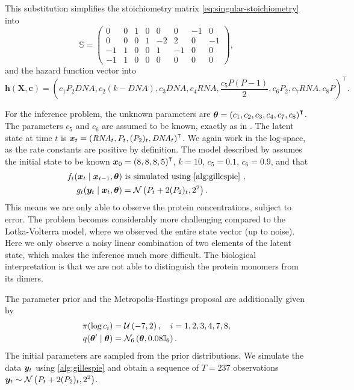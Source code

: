 This substitution simplifies the stoichiometry matrix \eqref{eq:singular-stoichiometry} into
\begin{equation*}
\mathbb{S} = \begin{pmatrix}
0 & 0 & 1 & 0 & 0 & 0 & -1 & 0 \\
0 & 0 & 0 & 1 & -2 & 2 & 0 & -1 \\
-1 & 1 & 0 & 0 & 1 & -1 & 0 & 0 \\
-1 & 1 & 0 & 0 & 0 & 0 & 0 & 0
\end{pmatrix},
\end{equation*}
and the hazard function vector into
\begin{equation*}
\bm{h}(\bm{X}, \bm{c}) = \left(c_1 P_2 \mathit{DNA}, c_2 (k - \mathit{DNA}), c_3 \mathit{DNA}, c_4 \mathit{RNA}, \frac{c_5 P(P-1)}{2}, c_6 P_2, c_7 \mathit{RNA}, c_8 P \right)^\intercal.
\end{equation*}

For the inference problem, the unknown parameters are $\bm{\theta} = \left(c_1, c_2, c_3, c_4, c_7, c_8\right)^\intercal$. The parameters $c_5$ and $c_6$ are assumed to be known, exactly as in \cite{wilkinson}. The latent state at time $t$ is $\bm{x}_t = \left(\mathit{RNA}_t, P_t, (P_2)_t, \mathit{DNA}_t\right)^\intercal$. We again work in the log-space, as the rate constants are positive by definition. The model described by \cite{wilkinson} assumes the initial state to be known $\bm{x}_0 = \left(8,8,8,5\right)^\intercal$, ${k = 10}$, ${c_5 = 0.1}$, ${c_6 = 0.9}$, and that
\begin{equation*}
\begin{split}
\trans_t(\bx_t \mid \bx_{t-1}, \btheta) & \text{ is simulated using \autoref{alg:gillespie} }, \\
\obs_t(\by_t \mid \bx_{t}, \btheta) &= \mathcal{N}\left(P_t + 2 (P_2)_t, 2^2\right).
\end{split}
\end{equation*}
This means we are only able to observe the protein concentrations, subject to error. The problem becomes considerably more challenging compared to the Lotka-Volterra model, where we observed the entire state vector (up to noise). Here we only observe a noisy linear combination of two elements of the latent state, which makes the inference much more difficult. The biological interpretation is that we are not able to distinguish the protein monomers from its dimers.

The parameter prior and the Metropolis-Hastings proposal are additionally given by
\begin{equation*}
\begin{split}
\pi(\log c_i) &= \mathcal{U}\left(-7, 2\right), \quad i = 1, 2, 3, 4, 7, 8, \\
q(\bm{\theta}^\prime \mid \bm{\theta}) &= \mathcal{N}_6\left(\bm{\theta}, 0.08 \mathbb{I}_6\right).
\end{split}
\end{equation*}
The initial parameters are sampled from the prior distributions. We simulate the data $\bm{y}_t$ using \autoref{alg:gillespie} and obtain a sequence of $T = 237$ observations $\bm{y}_t \sim \mathcal{N}\left(P_t + 2 (P_2)_t, 2^2\right)$.

